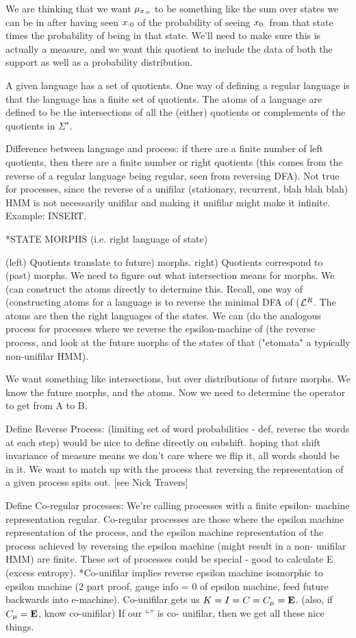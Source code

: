 \documentclass[prl,twocolumn,showpacs,superscriptaddress,preprintnumbers,floatfix]{revtex4-1}
\theoremstyle{plain}    \newtheorem{Lem}{Lemma}
\theoremstyle{plain}    \newtheorem*{ProLem}{Proof}
\theoremstyle{plain}    \newtheorem{Cor}{Corollary}
\theoremstyle{plain}    \newtheorem*{ProCor}{Proof}
\theoremstyle{plain}    \newtheorem{The}{Theorem}
\theoremstyle{plain}    \newtheorem*{ProThe}{Proof}
\theoremstyle{plain}    \newtheorem{Prop}{Proposition}
\theoremstyle{plain}    \newtheorem*{ProProp}{Proof}
\theoremstyle{plain}    \newtheorem*{Conj}{Conjecture}
\theoremstyle{plain}    \newtheorem*{Rem}{Remark}
\theoremstyle{plain}    \newtheorem{Def}{Definition}
\theoremstyle{plain}    \newtheorem*{Not}{Notation}
\begin{document}
We are thinking that we want $\mu_{{x}_{:0}}$ to be something like the sum over
states we can be in after having seen ${x}_{:0}$ of the probability of seeing
${x}_{0:}$ from that state times the probability of being in that state.
We'll need to make sure this is actually a measure, and we want this quotient to
include the data of both the support as well as a probability distribution.

A given language \Language has a set of quotients.  One way of defining a
regular language is that the language has a finite set of quotients.  The atoms
of a language are defined to be the intersections of all the (either) quotients
or complements of the quotients in $\Sigma^{\star}$.

Difference between language and process: if there are a finite number of left
quotients, then there are a finite number or right quotients (this comes from
the reverse of a regular language being regular, seen from reversing DFA).  Not
true for processes, since the reverse of a unifilar (stationary, recurrent, blah
blah blah) HMM is not necessarily unifilar and making it unifilar might make it
infinite. Example: INSERT.

*STATE MORPHS (i.e. right language of state)

(left) Quotients translate to future) morphs. right) Quotients correspond to
(past) morphs.  We need to figure out what intersection means for morphs.  We
(can construct the atoms directly to determine this.  Recall, one way of
(constructing atoms for a language \Language is to reverse the minimal DFA of
($\mathcal{L}^{R}$.  The atoms are then the right languages of the states. We can
(do the analogous process for processes where we reverse the epsilon-machine of
(the reverse process, and look at the future morphs of the states of that
("etomata" a typically non-unifilar HMM).

We want something like intersections, but over distributions of future morphs.
We know the future morphs, and the atoms.  Now we need to determine the operator
to get from A to B.

Define Reverse Process: (limiting set of word probabilities - def, reverse the
words at each step) would be nice to define directly on subshift. hoping that
shift invariance of measure means we don't care where we flip it, all words
should be in it.  We want to match up with the process that reversing the
\eM representation of a given process spits out. [see Nick Travers]

Define Co-regular processes: We're calling processes with a finite epsilon-
machine representation regular. Co-regular processes are those where the epsilon
machine representation of the process, and the epsilon machine representation of
the process achieved by reversing the epsilon machine (might result in a non-
unifilar HMM) are finite.  These set of processes could be special - good to
calculate E (excess entropy).  *Co-unifilar implies reverse epsilon machine
isomorphic to epsilon machine (2 part proof, gauge info = 0 of epsilon machine,
feed future backwards into e-machine). Co-unifilar gets us $K = I = C = C_\mu
= {\bf E}$.  (also, if $C_\mu = {\bf E}$, know co-unifilar) If our ``\eT'' is co-
unifilar, then we get all these nice things.
\end{document}

